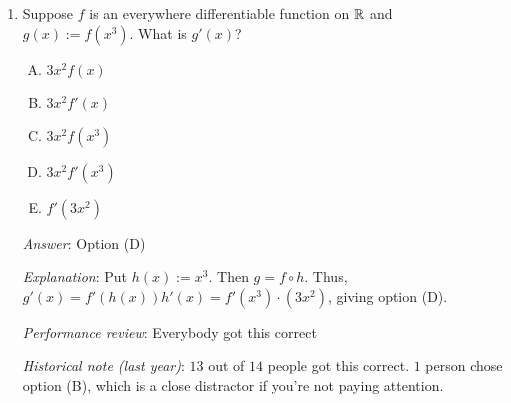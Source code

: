 \documentclass[10pt]{amsart}
\begin{document}
\begin{enumerate}
  {\em Answer}: Option (D)

  {\em Explanation}: This question is tricky because it requires the
  application of both the product rule and the chain rule, with the
  latter being used twice. We first note that:

  $$(f \circ g)' = (f' \circ g) \cdot g'$$

  Now, we differentiate both sides:

  $$(f \circ g)'' = [(f' \circ g) \cdot g']'$$

  The expression on the right side that needs to be differentiated is
  a product, so we use the product rule:

  $$(f \circ g)'' = [(f' \circ g)' \cdot g'] + [(f' \circ g) \cdot g'']$$

  Now, the inner composition $f' \circ g$ needs to be
  differentiated. We use the chain rule and obtain that $(f' \circ g)'
  = (f'' \circ g) \cdot g'$. Plugging this back in, we get:

  $$(f \circ g)'' = (f'' \circ g) \cdot (g')^2 + (f' \circ g) \cdot g''$$

  {\em Remark}: What's worth noting here is that in order to
  differentiate composites of functions, you need to use both
  composites {\em and} products (that's the chain rule). And in order
  to differentiate products, you need to use both products {\em and}
  sums (that's the product rule). Thus, in order to differentiate a
  composite twice, we need to use composites, products, {\em and}
  sums.

  {\em Performance review}: Everybody got this correct

  {\em Historical note (last year)}: $14$ out of $14$ people got this
  correct. This is great! I had expected that many of you would be put
  off by the messy computation, but apparently you were unfazed.

\item Suppose $f$ is an everywhere differentiable function on
  $\mathbb{R}$ and $g(x) := f(x^3)$. What is $g'(x)$?

  \begin{enumerate}[(A)]
  \item $3x^2f(x)$
  \item $3x^2f'(x)$
  \item $3x^2f(x^3)$
  \item $3x^2f'(x^3)$
  \item $f'(3x^2)$
  \end{enumerate}

  {\em Answer}: Option (D)

  {\em Explanation}: Put $h(x) := x^3$. Then $g = f \circ h$. Thus,
  $g'(x) = f'(h(x))h'(x) = f'(x^3) \cdot (3x^2)$, giving option (D).

  {\em Performance review}: Everybody got this correct

  {\em Historical note (last year)}: $13$ out of $14$ people got this
  correct. $1$ person chose option (B), which is a close distractor if
  you're not paying attention.
\end{enumerate}
\end{document}
